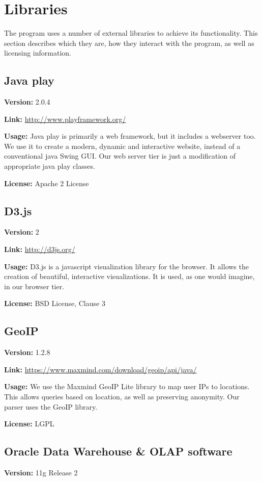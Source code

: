 \section{Libraries}

The program uses a number of external libraries to achieve its functionality. This section describes which they are,
how they interact with the program, as well as licensing information. 

\subsection{Java play}
\textbf{Version:} 2.0.4

\textbf{Link:} \url{http://www.playframework.org/}

\textbf{Usage:} 
Java play is primarily a web framework, but it includes a webserver too.
We use it to create a modern, dynamic and interactive website, instead of a conventional java Swing GUI.
Our web server tier is just a modification of appropriate java play classes.

\textbf{License:} Apache 2 License
\subsection{D3.js}
\textbf{Version:} 2

\textbf{Link:} \url{http://d3js.org/} 

\textbf{Usage:} 
D3.js is a javascript visualization library for the browser.
It allows the creation of beautiful, interactive visualizations.
It is used, as one would imagine, in our browser tier.

\textbf{License:} BSD License, Clause 3


\subsection{GeoIP}\label{geo}

\textbf{Version:} 1.2.8

\textbf{Link:} \url{https://www.maxmind.com/download/geoip/api/java/}

\textbf{Usage:} 
We use the Maxmind GeoIP Lite library to map user IPs to locations.
This allows queries based on location, as well as preserving anonymity.
Our parser uses the GeoIP library.

\textbf{License:} LGPL

\subsection{Oracle Data Warehouse \& OLAP software}
\textbf{Version:} 11g Release 2

